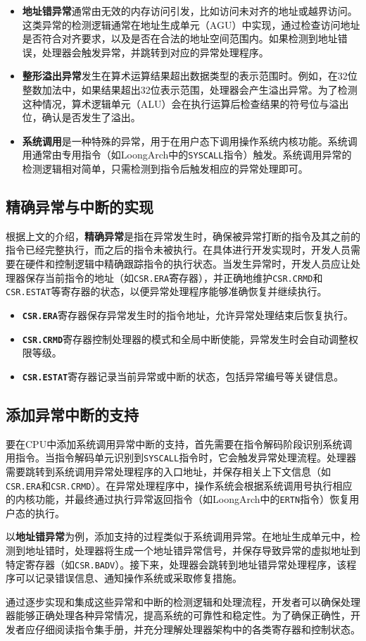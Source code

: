 \begin{itemize}
\item
  \textbf{地址错异常}通常由无效的内存访问引发，比如访问未对齐的地址或越界访问。这类异常的检测逻辑通常在地址生成单元（AGU）中实现，通过检查访问地址是否符合对齐要求，以及是否在合法的地址空间范围内。如果检测到地址错误，处理器会触发异常，并跳转到对应的异常处理程序。
\item
  \textbf{整形溢出异常}发生在算术运算结果超出数据类型的表示范围时。例如，在32位整数加法中，如果结果超出32位表示范围，处理器会产生溢出异常。为了检测这种情况，算术逻辑单元（ALU）会在执行运算后检查结果的符号位与溢出位，确认是否发生了溢出。
\item
  \textbf{系统调用}是一种特殊的异常，用于在用户态下调用操作系统内核功能。系统调用通常由专用指令（如LoongArch中的\texttt{SYSCALL}指令）触发。系统调用异常的检测逻辑相对简单，只需检测到指令后触发相应的异常处理即可。
\end{itemize}

\subsection{精确异常与中断的实现}\label{sec:07-exceptions-017}

根据上文的介绍，\textbf{精确异常}是指在异常发生时，确保被异常打断的指令及其之前的指令已经完整执行，而之后的指令未被执行。在具体进行开发实现时，开发人员需要在硬件和控制逻辑中精确跟踪指令的执行状态。当发生异常时，开发人员应让处理器保存当前指令的地址（如\texttt{CSR.ERA}寄存器），并正确地维护\texttt{CSR.CRMD}和\texttt{CSR.ESTAT}等寄存器的状态，以便异常处理程序能够准确恢复并继续执行。

\begin{itemize}
\tightlist
\item
  \textbf{\texttt{CSR.ERA}}寄存器保存异常发生时的指令地址，允许异常处理结束后恢复执行。
\item
  \textbf{\texttt{CSR.CRMD}}寄存器控制处理器的模式和全局中断使能，异常发生时会自动调整权限等级。
\item
  \textbf{\texttt{CSR.ESTAT}}寄存器记录当前异常或中断的状态，包括异常编号等关键信息。
\end{itemize}

\subsection{添加异常中断的支持}\label{sec:07-exceptions-018}

要在CPU中添加系统调用异常中断的支持，首先需要在指令解码阶段识别系统调用指令。当指令解码单元识别到\texttt{SYSCALL}指令时，它会触发异常处理流程。处理器需要跳转到系统调用异常处理程序的入口地址，并保存相关上下文信息（如\texttt{CSR.ERA}和\texttt{CSR.CRMD}）。在异常处理程序中，操作系统会根据系统调用号执行相应的内核功能，并最终通过执行异常返回指令（如LoongArch中的\texttt{ERTN}指令）恢复用户态的执行。

以\textbf{地址错异常}为例，添加支持的过程类似于系统调用异常。在地址生成单元中，检测到地址错时，处理器将生成一个地址错异常信号，并保存导致异常的虚拟地址到特定寄存器（如\texttt{CSR.BADV}）。接下来，处理器会跳转到地址错异常处理程序，该程序可以记录错误信息、通知操作系统或采取修复措施。

通过逐步实现和集成这些异常和中断的检测逻辑和处理流程，开发者可以确保处理器能够正确处理各种异常情况，提高系统的可靠性和稳定性。为了确保正确性，开发者应仔细阅读指令集手册，并充分理解处理器架构中的各类寄存器和控制状态。
